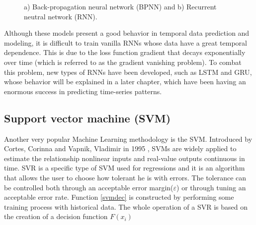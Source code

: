 \begin{figure}[h!]
\captionsetup[subfigure]{position=b}
\centering
\label{fig:Mould}
\hspace{0.05\textwidth}
\caption{a) Back-propagation neural network (BPNN)  and b) Recurrent neutral network (RNN).}
\end{figure}

Although these models present a good behavior in temporal data prediction and modeling, it is difficult to train vanilla \ac{RNN}s whose data have a great temporal dependence. This is due to the loss function gradient that decays exponentially over time (which is referred to as the gradient vanishing problem)\cite{rnn4}. To combat this problem, new types of \ac{RNN}s have been developed, such as \ac{LSTM} and \ac{GRU}, whose behavior will be explained in a later chapter, which have been having an enormous success in predicting time-series patterns. 


\subsection{Support vector machine (SVM)}

Another very popular Machine Learning methodology is the \ac{SVM}. Introduced by Cortes, Corinna and Vapnik, Vladimir in 1995 \cite{svm1}, \ac{SVM}s are widely applied to estimate the relationship nonlinear inputs and real-value outputs continuous in time. \ac{SVR} is a specific type of \ac{SVM} used for regressions and it is an algorithm that allows the user to choose how tolerant he is with errors. The tolerance can be controlled both through an acceptable error margin($\varepsilon$) or through tuning an acceptable error rate.
Function \ref{svmdec} is constructed by performing some training process with historical data. The whole operation of a \ac{SVR} is based on the creation of a decision function $F(x_i)$

